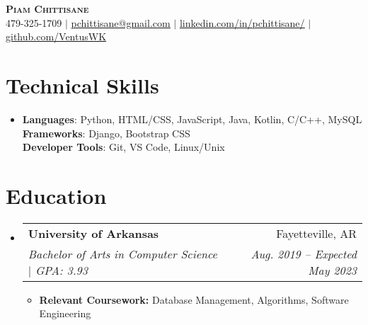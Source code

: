 \documentclass[letterpaper,11pt]{article}
\makeatletter
\newcommand{\resumeItem}[1]{
  \item\small{
    {#1 \vspace{-2pt}}
  }
}
\newcommand{\resumeSubheading}[4]{
  \vspace{-2pt}\item
    \begin{tabular*}{0.97\textwidth}[t]{l@{\extracolsep{\fill}}r}
      \textbf{#1} & #2 \\
      \textit{\small#3} & \textit{\small #4} \\
    \end{tabular*}\vspace{-7pt}
}
\newcommand{\resumeSubHeadingListStart}{\begin{itemize}[leftmargin=0.15in, label={}]}
\newcommand{\resumeSubHeadingListEnd}{\end{itemize}}
\newcommand{\resumeItemListStart}{\begin{itemize}}
\newcommand{\resumeItemListEnd}{\end{itemize}\vspace{-5pt}}
\makeatother
\begin{document}

\begin{center}
    \textbf{\Huge \scshape Piam Chittisane} \\ \vspace{1pt}
    \small 479-325-1709 $|$ \href{mailto:pchittisane@gmail.com}{\underline{pchittisane@gmail.com}} $|$ 
    \href{https://linkedin.com/in/pchittisane}{\underline{linkedin.com/in/pchittisane/}} $|$
    \href{https://github.com/VentusWK}{\underline{github.com/VentusWK}}
\end{center}

\section{Technical Skills}
 \begin{itemize}[leftmargin=0.15in, label={}]
    \item{\small
     \textbf{Languages}{: Python, HTML/CSS, JavaScript, Java, Kotlin, C/C++, MySQL} \\
     \textbf{Frameworks}{: Django, Bootstrap CSS} \\
     \textbf{Developer Tools}{: Git, VS Code, Linux/Unix} \\
    }
 \end{itemize}


\section{Education}
  \resumeSubHeadingListStart
    \resumeSubheading
      {University of Arkansas}{Fayetteville, AR}
      {Bachelor of Arts in Computer Science $\mid$ GPA: 3.93}{Aug. 2019 -- Expected May 2023}
      \resumeItemListStart
        \resumeItem{\textbf{Relevant Coursework:}{ Database Management, Algorithms, Software Engineering} }
      \resumeItemListEnd
  \resumeSubHeadingListEnd
  


\end{document}
